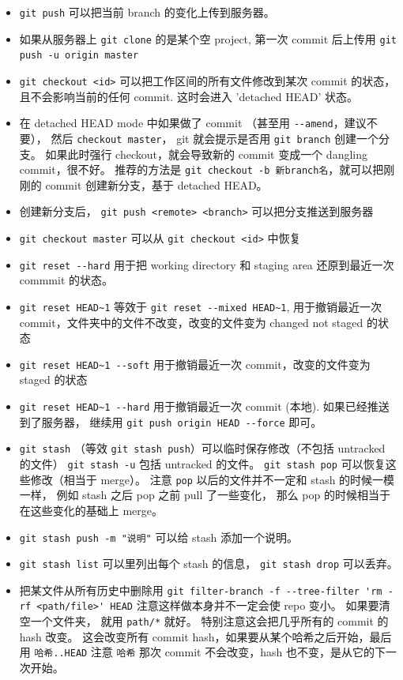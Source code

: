 \begin{itemize}
\item \verb`git push` 可以把当前 branch 的变化上传到服务器。
\item 如果从服务器上 \verb`git clone` 的是某个空 project, 第一次 commit 后上传用 \verb`git push -u origin master`
\item \verb`git checkout <id>` 可以把工作区间的所有文件修改到某次 commit 的状态， 且不会影响当前的任何 commit. 这时会进入 'detached HEAD' 状态。
\item 在 detached HEAD mode 中如果做了 commit （甚至用 \verb`--amend`，建议不要）， 然后 \verb`checkout master`， git 就会提示是否用 \verb`git branch` 创建一个分支。 如果此时强行 checkout，就会导致新的 commit 变成一个 dangling commit，很不好。 推荐的方法是 \verb`git checkout -b 新branch名`，就可以把刚刚的 commit 创建新分支，基于 detached HEAD。
\item 创建新分支后， \verb`git push <remote> <branch>` 可以把分支推送到服务器
\item \verb`git checkout master` 可以从 \verb`git checkout <id>` 中恢复
\item \verb`git reset --hard` 用于把 working directory 和 staging area 还原到最近一次 commmit 的状态。
\item \verb`git reset HEAD~1` 等效于 \verb`git reset --mixed HEAD~1`, 用于撤销最近一次 commit，文件夹中的文件不改变，改变的文件变为 changed not staged 的状态
\item \verb`git reset HEAD~1 --soft` 用于撤销最近一次 commit，改变的文件变为 staged 的状态
\item \verb`git reset HEAD~1 --hard` 用于撤销最近一次 commit (本地). 如果已经推送到了服务器， 继续用 \verb`git push origin HEAD --force` 即可。
\item \verb`git stash` （等效 \verb`git stash push`）可以临时保存修改（不包括 untracked 的文件） \verb`git stash -u` 包括 untracked 的文件。 \verb`git stash pop` 可以恢复这些修改（相当于 merge）。 注意 \verb`pop` 以后的文件并不一定和 stash 的时候一模一样， 例如 stash 之后 pop 之前 pull 了一些变化， 那么 pop 的时候相当于在这些变化的基础上 merge。
\item \verb`git stash push -m "说明"` 可以给 stash 添加一个说明。
\item \verb`git stash list` 可以里列出每个 stash 的信息， \verb`git stash drop` 可以丢弃。
\item 把某文件从所有历史中删除用 \verb`git filter-branch -f --tree-filter 'rm -rf <path/file>' HEAD` 注意这样做本身并不一定会使 repo 变小。 如果要清空一个文件夹， 就用 \verb`path/*` 就好。 特别注意这会把几乎所有的 commit 的 hash 改变。 这会改变所有 commit hash，如果要从某个哈希之后开始，最后用 \verb`哈希..HEAD` 注意 \verb`哈希` 那次 commit 不会改变，hash 也不变，是从它的下一次开始。

\end{itemize}
